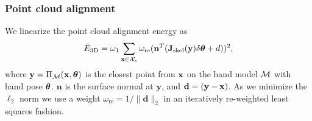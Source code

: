 \subsubsection*{Point cloud alignment} 
%
%
We linearize the point cloud alignment energy as 
%
\begin{equation*}
\bar{E}_{\text{3D}}  = \omega_1 \sum_{\mathbf{x} \in \mathcal{X}_{s}} \omega_{\text{re}} (\mathbf{n}^T(\mathbf{J}_{\text{skel}}(\mathbf{y}) \delta\boldsymbol{\theta} + d))^2,
\end{equation*}
%
where $\mathbf{y} = \Pi_{\mathcal{M}}(\mathbf{x},\boldsymbol{\theta})$ is the closest point from $\mathbf{x}$ on the hand model $\mathcal{M}$ with hand pose $\boldsymbol{\theta}$. $\mathbf{n}$ is the surface normal at $\mathbf{y}$, and $\mathbf{d} = (\mathbf{y} - \mathbf{x})$.
 As we minimize the $\ell_2$ norm we use a weight $\omega_{\text{re}}=1/\|\mathbf{d}\|_2$ in an iteratively re-weighted least squares fashion.
%
% 
%  
% 
%  
